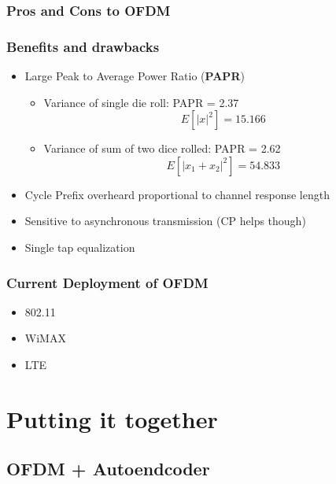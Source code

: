 \documentclass{beamer}
\begin{document}
\subsubsection{Pros and Cons to OFDM}

\begin{frame}
	\frametitle{Benefits and drawbacks}
	\begin{itemize}
		\item Large Peak to Average Power Ratio (\textbf{PAPR})
			\begin{itemize}
				\item{Variance of single die roll: PAPR = 2.37
					\begin{equation*}
						E[|x|^2] = 15.166
					\end{equation*}}

				\item{Variance of sum of two dice rolled: PAPR = 2.62
					\begin{equation*}
						E[|x_1+x_2|^2] = 54.833
					\end{equation*}}
			\end{itemize}
		
		\item Cycle Prefix overheard proportional to channel response length

		\item Sensitive to asynchronous transmission (CP helps though)
		
		\item Single tap equalization
		

	\end{itemize}
\end{frame}

\begin{frame}
\frametitle{Current Deployment of OFDM}
	\begin{itemize}
		\item 802.11
		\item WiMAX
		\item LTE
	\end{itemize}
\end{frame}


\section{Putting it together}

\subsection{OFDM + Autoendcoder}
\end{document}
